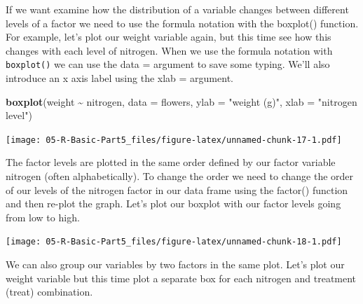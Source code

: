 \documentclass[
]{book}
\newenvironment{Shaded}{\begin{snugshade}}{\end{snugshade}}
\newcommand{\AttributeTok}[1]{\textcolor[rgb]{0.13,0.29,0.53}{#1}}
\newcommand{\FunctionTok}[1]{\textcolor[rgb]{0.13,0.29,0.53}{\textbf{#1}}}
\newcommand{\NormalTok}[1]{#1}
\newcommand{\OtherTok}[1]{\textcolor[rgb]{0.56,0.35,0.01}{#1}}
\newcommand{\SpecialCharTok}[1]{\textcolor[rgb]{0.81,0.36,0.00}{\textbf{#1}}}
\newcommand{\StringTok}[1]{\textcolor[rgb]{0.31,0.60,0.02}{#1}}
\begin{document}
If we want examine how the distribution of a variable changes between different levels of a factor we need to use the formula notation with the boxplot() function. For example, let's plot our weight variable again, but this time see how this changes with each level of nitrogen. When we use the formula notation with \texttt{boxplot()} we can use the data = argument to save some typing. We'll also introduce an x axis label using the xlab = argument.

\begin{Shaded}
\begin{Highlighting}[]
\FunctionTok{boxplot}\NormalTok{(weight }\SpecialCharTok{\textasciitilde{}}\NormalTok{ nitrogen, }\AttributeTok{data =}\NormalTok{ flowers, }
         \AttributeTok{ylab =} \StringTok{"weight (g)"}\NormalTok{, }\AttributeTok{xlab =} \StringTok{"nitrogen level"}\NormalTok{)}
\end{Highlighting}
\end{Shaded}

\texttt{[image: 05-R-Basic-Part5\_files/figure-latex/unnamed-chunk-17-1.pdf]}

The factor levels are plotted in the same order defined by our factor variable nitrogen (often alphabetically). To change the order we need to change the order of our levels of the nitrogen factor in our data frame using the factor() function and then re-plot the graph. Let's plot our boxplot with our factor levels going from low to high.

\begin{Shaded}
\end{Shaded}

\texttt{[image: 05-R-Basic-Part5\_files/figure-latex/unnamed-chunk-18-1.pdf]}

We can also group our variables by two factors in the same plot. Let's plot our weight variable but this time plot a separate box for each nitrogen and treatment (treat) combination.
\end{document}
